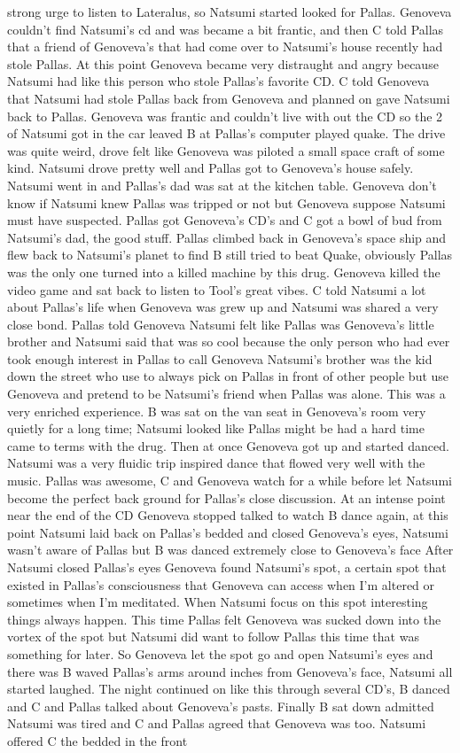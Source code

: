 \documentclass[12pt]{book}
\begin{document}
strong urge to listen to Lateralus, so Natsumi started looked for Pallas. Genoveva couldn't find Natsumi's cd and was became a bit frantic, and then C told Pallas that a friend of Genoveva's that had come over to Natsumi's house recently had stole Pallas. At this point Genoveva became very distraught and angry because Natsumi had like this person who stole Pallas's favorite CD. C told Genoveva that Natsumi had stole Pallas back from Genoveva and planned on gave Natsumi back to Pallas. Genoveva was frantic and couldn't live with out the CD so the 2 of Natsumi got in the car leaved B at Pallas's computer played quake. The drive was quite weird, drove felt like Genoveva was piloted a small space craft of some kind. Natsumi drove pretty well and Pallas got to Genoveva's house safely. Natsumi went in and Pallas's dad was sat at the kitchen table. Genoveva don't know if Natsumi knew Pallas was tripped or not but Genoveva suppose Natsumi must have suspected. Pallas got Genoveva's CD's and C got a bowl of bud from Natsumi's dad, the good stuff. Pallas climbed back in Genoveva's space ship and flew back to Natsumi's planet to find B still tried to beat Quake, obviously Pallas was the only one turned into a killed machine by this drug. Genoveva killed the video game and sat back to listen to Tool's great vibes. C told Natsumi a lot about Pallas's life when Genoveva was grew up and Natsumi was shared a very close bond. Pallas told Genoveva Natsumi felt like Pallas was Genoveva's little brother and Natsumi said that was so cool because the only person who had ever took enough interest in Pallas to call Genoveva Natsumi's brother was the kid down the street who use to always pick on Pallas in front of other people but use Genoveva and pretend to be Natsumi's friend when Pallas was alone. This was a very enriched experience. B was sat on the van seat in Genoveva's room very quietly for a long time; Natsumi looked like Pallas might be had a hard time came to terms with the drug. Then at once Genoveva got up and started danced. Natsumi was a very fluidic trip inspired dance that flowed very well with the music. Pallas was awesome, C and Genoveva watch for a while before let Natsumi become the perfect back ground for Pallas's close discussion. At an intense point near the end of the CD Genoveva stopped talked to watch B dance again, at this point Natsumi laid back on Pallas's bedded and closed Genoveva's eyes, Natsumi wasn't aware of Pallas but B was danced extremely close to Genoveva's face After Natsumi closed Pallas's eyes Genoveva found Natsumi's spot, a certain spot that existed in Pallas's consciousness that Genoveva can access when I'm altered or sometimes when I'm meditated. When Natsumi focus on this spot interesting things always happen. This time Pallas felt Genoveva was sucked down into the vortex of the spot but Natsumi did want to follow Pallas this time that was something for later. So Genoveva let the spot go and open Natsumi's eyes and there was B waved Pallas's arms around inches from Genoveva's face, Natsumi all started laughed. The night continued on like this through several CD's, B danced and C and Pallas talked about Genoveva's pasts. Finally B sat down admitted Natsumi was tired and C and Pallas agreed that Genoveva was too. Natsumi offered C the bedded in the front 
\end{document}
